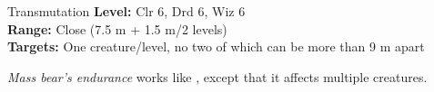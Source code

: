 {Transmutation}
{
	\textbf{Level:}
	Clr 6, Drd 6, Wiz 6\\
	\textbf{Range:}
	Close (7.5 m + 1.5 m/2 levels)\\
	\textbf{Targets:}
	One creature/level, no two of which can be more than 9 m apart\\
}
{
	\emph{Mass bear's endurance} works like , except that it affects multiple creatures.

}
